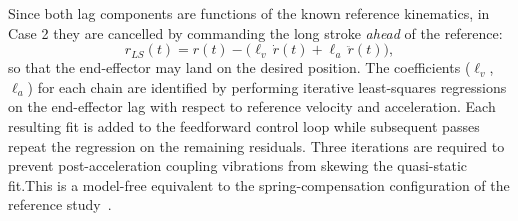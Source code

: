 Since both lag components are functions of the known reference kinematics, in Case 2 they are cancelled by commanding the long stroke \textit{ahead} of the reference:
\begin{equation}
    r_{LS}(t) = r(t) - \big(\ell_v\, \dot{r}(t) + \ell_a\, \ddot{r}(t)\big),
    \label{eq:lag_ff}
\end{equation}
so that the end-effector may land on the desired position. The coefficients ($\ell_v$, $\ell_a$) for each chain are identified by performing iterative least-squares regressions on the end-effector lag with respect to reference velocity and acceleration. Each resulting fit is added to the feedforward control loop while subsequent passes repeat the regression on the remaining residuals. Three iterations are required to prevent post-acceleration coupling vibrations from skewing the quasi-static fit.This is a model-free equivalent to the spring-compensation configuration of the reference study~\cite{Al-Rawashdeh2022_Caracterization}.

